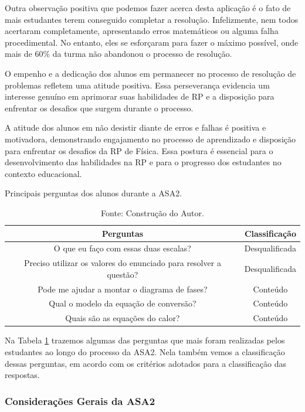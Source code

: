 Outra observação positiva que podemos fazer acerca desta aplicação é o fato de mais estudantes terem conseguido completar a resolução. Infelizmente, nem todos acertaram completamente, apresentando erros matemáticos ou alguma falha procedimental. No entanto, eles se esforçaram para fazer o máximo possível, onde mais de 60\% da turma não abandonou o processo de resolução.

O empenho e a dedicação dos alunos em permanecer no processo de resolução de problemas refletem uma atitude positiva. Essa perseverança evidencia um interesse genuíno em aprimorar suas habilidades de RP e a disposição para enfrentar os desafios que surgem durante o processo.

A atitude dos alunos em não desistir diante de erros e falhas é positiva e motivadora, demonstrando engajamento no processo de aprendizado e disposição para enfrentar os desafios da RP de Física. Essa postura é essencial para o desenvolvimento das habilidades na RP e para o progresso dos estudantes no contexto educacional.

\begin{table}[ht]
\centering
\caption{Principais perguntas dos alunos durante a ASA2.} \label{tab:pergASA2}
\begin{tabular}{c|c}
\hline
\textbf{Perguntas} & \textbf{Classificação}\\ \hline
O que eu faço com essas duas escalas? & Desqualificada \\
Preciso utilizar os valores do enunciado para resolver a questão? & Desqualificada \\
Pode me ajudar a montar o diagrama de fases? & Conteúdo \\
Qual o modelo da equação de conversão? & Conteúdo \\
Quais são as equações do calor? & Conteúdo\\
\hline
\end{tabular}
\caption*{Fonte: Construção do Autor.}
\end{table}

Na Tabela \ref{tab:pergASA2} trazemos algumas das perguntas que mais foram realizadas pelos estudantes ao longo do processo da ASA2. Nela também vemos a classificação dessas perguntas, em acordo com os critérios adotados para a classificação das respostas.

\subsubsection{Considerações Gerais da ASA2} \label{subsubsec:asa2}

